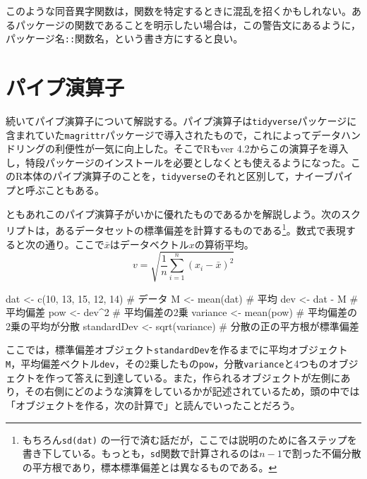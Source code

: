 \documentclass[
  a4paper,
]{ltjsbook}
\newenvironment{Shaded}{\begin{snugshade}}{\end{snugshade}}
\newcommand{\CommentTok}[1]{\textcolor[rgb]{0.37,0.37,0.37}{#1}}
\newcommand{\DecValTok}[1]{\textcolor[rgb]{0.68,0.00,0.00}{#1}}
\newcommand{\FunctionTok}[1]{\textcolor[rgb]{0.28,0.35,0.67}{#1}}
\newcommand{\NormalTok}[1]{\textcolor[rgb]{0.00,0.23,0.31}{#1}}
\newcommand{\OtherTok}[1]{\textcolor[rgb]{0.00,0.23,0.31}{#1}}
\newcommand{\SpecialCharTok}[1]{\textcolor[rgb]{0.37,0.37,0.37}{#1}}
\begin{document}
このような同音異字関数は，関数を特定するときに混乱を招くかもしれない。あるパッケージの関数であることを明示したい場合は，この警告文にあるように，パッケージ名\texttt{::}関数名，という書き方にすると良い。

\section{パイプ演算子}\label{ux30d1ux30a4ux30d7ux6f14ux7b97ux5b50}

続いてパイプ演算子について解説する。パイプ演算子は\texttt{tidyverse}パッケージに含まれていた\texttt{magrittr}パッケージで導入されたもので，これによってデータハンドリングの利便性が一気に向上した。そこでRもver
4.2からこの演算子を導入し，特段パッケージのインストールを必要としなくとも使えるようになった。このR本体のパイプ演算子のことを，\texttt{tidyverse}のそれと区別して，ナイーブパイプと呼ぶこともある。

ともあれこのパイプ演算子がいかに優れたものであるかを解説しよう。次のスクリプトは，あるデータセットの標準偏差を計算するものである\footnote{もちろん\texttt{sd(dat)}
  の一行で済む話だが，ここでは説明のために各ステップを書き下している。もっとも，\texttt{sd}関数で計算されるのは\(n-1\)で割った不偏分散の平方根であり，標本標準偏差とは異なるものである。}。数式で表現すると次の通り。ここで\(\bar{x}\)はデータベクトル\(x\)の算術平均。
\[v = \sqrt{\frac{1}{n}\sum_{i=1}^n (x_i - \bar{x})^2}\]

\begin{Shaded}
\begin{Highlighting}[]
\NormalTok{dat }\OtherTok{\textless{}{-}} \FunctionTok{c}\NormalTok{(}\DecValTok{10}\NormalTok{, }\DecValTok{13}\NormalTok{, }\DecValTok{15}\NormalTok{, }\DecValTok{12}\NormalTok{, }\DecValTok{14}\NormalTok{) }\CommentTok{\# データ}
\NormalTok{M }\OtherTok{\textless{}{-}} \FunctionTok{mean}\NormalTok{(dat) }\CommentTok{\# 平均}
\NormalTok{dev }\OtherTok{\textless{}{-}}\NormalTok{ dat }\SpecialCharTok{{-}}\NormalTok{ M }\CommentTok{\# 平均偏差}
\NormalTok{pow }\OtherTok{\textless{}{-}}\NormalTok{ dev}\SpecialCharTok{\^{}}\DecValTok{2} \CommentTok{\# 平均偏差の2乗}
\NormalTok{variance }\OtherTok{\textless{}{-}} \FunctionTok{mean}\NormalTok{(pow) }\CommentTok{\# 平均偏差の2乗の平均が分散}
\NormalTok{standardDev }\OtherTok{\textless{}{-}} \FunctionTok{sqrt}\NormalTok{(variance) }\CommentTok{\# 分散の正の平方根が標準偏差}
\end{Highlighting}
\end{Shaded}

ここでは，標準偏差オブジェクト\texttt{standardDev}を作るまでに平均オブジェクト\texttt{M}，平均偏差ベクトル\texttt{dev}，その2乗したもの\texttt{pow}，分散\texttt{variance}と4つものオブジェクトを作って答えに到達している。また，作られるオブジェクトが左側にあり，その右側にどのような演算をしているかが記述されているため，頭の中では「オブジェクトを作る，次の計算で」と読んでいったことだろう。
\end{document}
